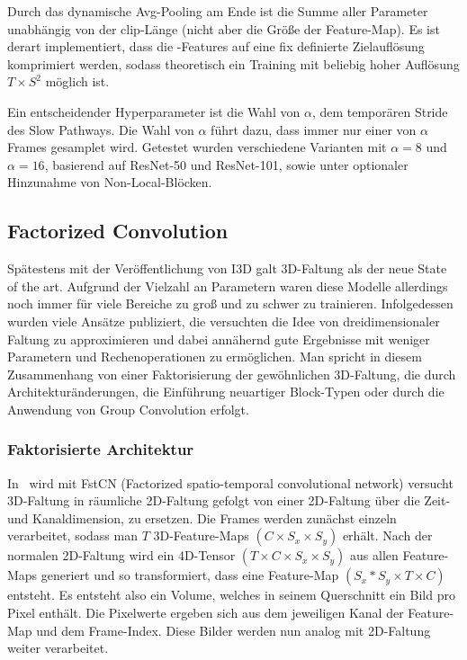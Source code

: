 Durch das dynamische Avg-Pooling am Ende ist die Summe aller Parameter unabhängig von der \gls{clip}-Länge (nicht aber die Größe der Feature-Map).
Es ist derart implementiert, dass die \conv-Features auf eine fix definierte Zielauflösung komprimiert werden, sodass theoretisch ein Training mit beliebig hoher Auflösung $T \times S^2$ möglich ist.

Ein entscheidender Hyperparameter ist die Wahl von $\alpha$, dem temporären Stride des Slow Pathways.
Die Wahl von $\alpha$ führt dazu, dass immer nur einer von $\alpha$ Frames gesamplet wird.
Getestet wurden verschiedene Varianten mit $\alpha = 8$ und $\alpha = 16$, basierend auf ResNet-50 und ResNet-101, sowie unter optionaler Hinzunahme von Non-Local-Blöcken.

\subsection{Factorized Convolution}
\label{subsec:factorized-convolution}

Spätestens mit der Veröffentlichung von I3D galt 3D-Faltung als der neue State of the art.
Aufgrund der Vielzahl an Parametern waren diese Modelle allerdings noch immer für viele Bereiche zu groß und zu schwer zu trainieren.
Infolgedessen wurden viele Ansätze publiziert, die versuchten die Idee von dreidimensionaler Faltung zu approximieren und dabei annähernd gute Ergebnisse mit weniger Parametern und Rechenoperationen zu ermöglichen.
Man spricht in diesem Zusammenhang von einer Faktorisierung der gewöhnlichen 3D-Faltung, die durch Architekturänderungen, die Einführung neuartiger Block-Typen oder durch die Anwendung von Group Convolution erfolgt.

\subsubsection{Faktorisierte Architektur}

In~\cite{Sun15} wird mit FstCN (Factorized spatio-temporal convolutional network) versucht 3D-Faltung in räumliche 2D-Faltung gefolgt von einer 2D-Faltung über die Zeit- und Kanaldimension, zu ersetzen.
Die Frames werden zunächst einzeln verarbeitet, sodass man ${T}$ 3D-Feature-Maps $(C \times S_x \times S_y)$ erhält.
Nach der normalen 2D-Faltung wird ein 4D-Tensor $(T \times C \times S_x \times S_y)$ aus allen Feature-Maps generiert und so transformiert, dass eine Feature-Map $(S_x * S_y \times T \times C)$ entsteht.
Es entsteht also ein Volume, welches in seinem Querschnitt ein Bild pro Pixel enthält.
Die Pixelwerte ergeben sich aus dem jeweiligen Kanal der Feature-Map und dem Frame-Index.
Diese Bilder werden nun analog mit 2D-Faltung weiter verarbeitet.

